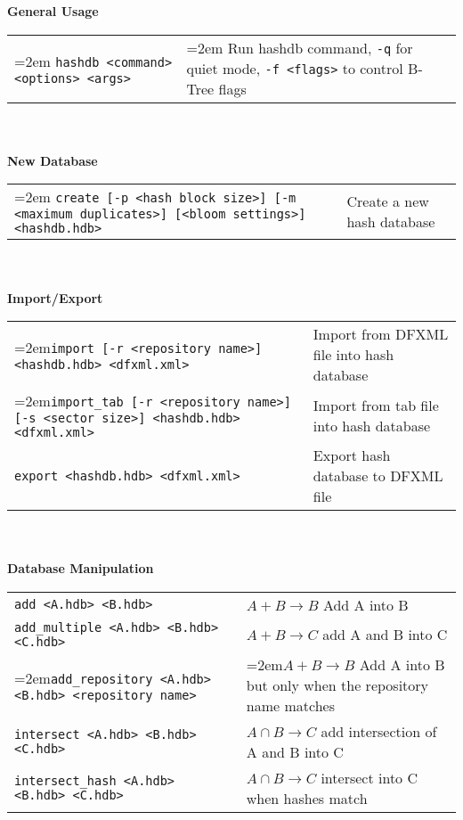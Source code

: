 \begin{small}
\begin{footnotesize}
\textbf{General Usage} \\
\begin{tabular}{p{3.6 in} p{3.0 in}}
\hangindent=2em \texttt{hashdb <command> <options> <args>} & \hangindent=2em Run hashdb command, \texttt{-q} for quiet mode, \texttt{-f <flags>} to control B-Tree flags \\
\end{tabular}
\\
\\
\textbf{New Database} \\
\begin{tabular}{p{3.6 in} p{3.0 in}}
\hangindent=2em \texttt{create [-p <hash block size>] [-m <maximum duplicates>] [<bloom settings>] <hashdb.hdb>} &
Create a new hash database \\
\end{tabular}
\\
\\
\textbf{Import/Export} \\
\begin{tabular}{p{3.6 in} p{3.0 in}}
\hangindent=2em\texttt{import [-r <repository name>] <hashdb.hdb> <dfxml.xml>} &
Import from DFXML file into hash database \\
\hangindent=2em\texttt{import\_tab [-r <repository name>] [-s <sector size>] <hashdb.hdb> <dfxml.xml>} &
Import from tab file into hash database \\
\texttt{export <hashdb.hdb> <dfxml.xml>} &
Export hash database to DFXML file \\
\end{tabular}
\\
\\
\textbf{Database Manipulation} \\
\begin{tabular}{p{3.6 in} p{3.0 in}}
\texttt{add <A.hdb> <B.hdb>} & $A + B \rightarrow B$ Add A into B \\
\texttt{add\_multiple <A.hdb> <B.hdb> <C.hdb>} & $A + B \rightarrow C$ add A and B into C\\
\hangindent=2em\texttt{add\_repository <A.hdb> <B.hdb> <repository name>} & \hangindent=2em$A + B \rightarrow B$ Add A into B but only when the repository name matches \\
\texttt{intersect <A.hdb> <B.hdb> <C.hdb>} & $A \cap B \rightarrow C$ add intersection of A and B into C\\
\texttt{intersect\_hash <A.hdb> <B.hdb> <C.hdb>} & $A \cap B \rightarrow C$ intersect into C when hashes match\\

\end{tabular}
\end{footnotesize}
\end{small}
